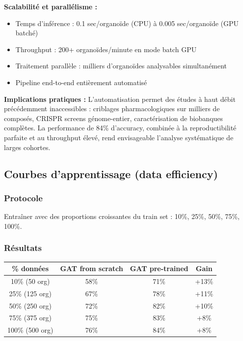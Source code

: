 \textbf{Scalabilité et parallélisme :}
\begin{itemize}
    \item Temps d'inférence : 0.1 sec/organoïde (CPU) à 0.005 sec/organoïde (GPU batché)
    \item Throughput : 200+ organoïdes/minute en mode batch GPU
    \item Traitement parallèle : milliers d'organoïdes analysables simultanément
    \item Pipeline end-to-end entièrement automatisé
\end{itemize}

\textbf{Implications pratiques :}
L'automatisation permet des études à haut débit précédemment inaccessibles : criblages pharmacologiques sur milliers de composés, CRISPR screens génome-entier, caractérisation de biobanques complètes. La performance de 84\% d'accuracy, combinée à la reproductibilité parfaite et au throughput élevé, rend envisageable l'analyse systématique de larges cohortes.


\subsection{Courbes d'apprentissage (data efficiency)}

\subsubsection{Protocole}

Entraîner avec des proportions croissantes du train set : 10\%, 25\%, 50\%, 75\%, 100\%.

\subsubsection{Résultats}

\begin{center}
\begin{tabular}{|c|c|c|c|}
\hline
\textbf{\% données} & \textbf{GAT from scratch} & \textbf{GAT pre-trained} & \textbf{Gain} \\
\hline
10\% (50 org) & 58\% & 71\% & +13\% \\
25\% (125 org) & 67\% & 78\% & +11\% \\
50\% (250 org) & 72\% & 82\% & +10\% \\
75\% (375 org) & 75\% & 83\% & +8\% \\
100\% (500 org) & 76\% & 84\% & +8\% \\
\hline
\end{tabular}
\end{center}

